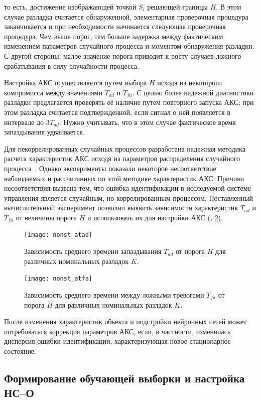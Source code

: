 \noindent то есть, достижение изображающей точкой $S_i$ решающей
границы $H$.  В этом случае разладка считается обнаруженной,
элементарная проверочная процедура заканчивается и при необходимости
начинается следующая проверочная процедура.  Чем выше порог, тем
больше задержка между фактическим изменением параметров случайного
процесса и моментом обнаружения разладки.  С другой стороны, малое
значение порога приводит к росту случаев ложного срабатывания в силу
случайности процесса.

Настройка АКС осуществляется путем выбора $H$ исходя из некоторого
компромисса между значениями $T_{ad}$ и $T_{fa}$.  С целью более
надежной диагностики разладки предлагается проверять её наличие путем
повторного запуска АКС; при этом разладка считается подтвержденной,
если сигнал о ней появляется в интервале до $3T_{ad}$.  Нужно
учитывать, что в этом случае фактическое время запаздывания
удваивается.

Для некоррелированных случайных процессов разработана надежная
методика расчета характеристик АКС исходя из параметров распределения
случайного процесса~\cite{filatov83}.  Однако эксперименты показали
некоторое несоответствие наблюдаемых и рассчитанных по этой методике
характеристик АКС.  Причина несоответствия вызвана тем, что ошибка
идентификации в исследуемой системе управления является случайным, но
коррелированным процессом.  Поставленный вычислительный эксперимент
позволил выявить зависимости характеристик $T_{ad}$ и $T_{fa}$ от
величины порога $H$ и использовать их для настройки АКС
(, \ref{fig:nonst_atfa}).

\begin{figure}[h]
\centering
\texttt{[image: nonst\_atad]}
\caption{Зависимость среднего времени запаздывания $T_{ad}$ от порога
  $H$ для различных номинальных разладок $K$.}
\label{fig:nonst_atad}
\end{figure}

\begin{figure}[h]
\centering
\texttt{[image: nonst\_atfa]}
\caption{Зависимость среднего времени между ложными тревогами $T_{fa}$
  от порога $H$ для различных номинальных разладок $K$.}
\label{fig:nonst_atfa}
\end{figure}

После изменения характеристик объекта и подстройки нейронных сетей
может потребоваться коррекция параметров АКС, если, в частности,
изменилась дисперсия ошибки идентификации, характеризующая новое
стационарное состояние.

\subsection{Формирование обучающей выборки и настройка НС--О}

